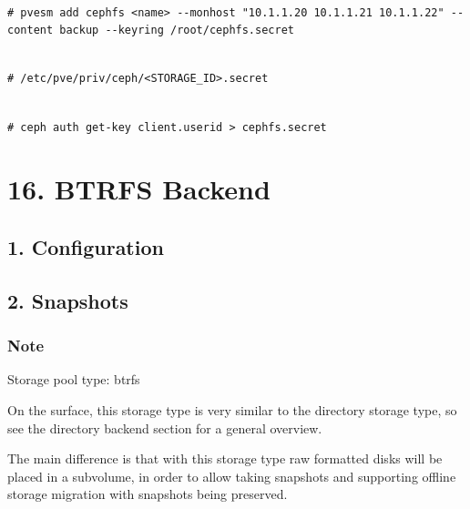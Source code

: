 \begin{lstlisting}

# pvesm add cephfs <name> --monhost "10.1.1.20 10.1.1.21 10.1.1.22" --content backup --keyring /root/cephfs.secret

\end{lstlisting}

\begin{lstlisting}

# /etc/pve/priv/ceph/<STORAGE_ID>.secret

\end{lstlisting}

\begin{lstlisting}

# ceph auth get-key client.userid > cephfs.secret

\end{lstlisting}

\begin{table}[htbp]

\centering

\begin{tabular}

\end{tabular}

\end{table}


\section{16. BTRFS Backend}

\subsection{1. Configuration}

\subsection{2. Snapshots}

\subsubsection{Note}

Storage pool type: btrfs

On the surface, this storage type is very similar to the directory storage type, so see the directory backend section for a general overview.

The main difference is that with this storage type raw formatted disks will be placed in a subvolume, in order to allow taking snapshots and supporting offline storage migration with snapshots being preserved.

